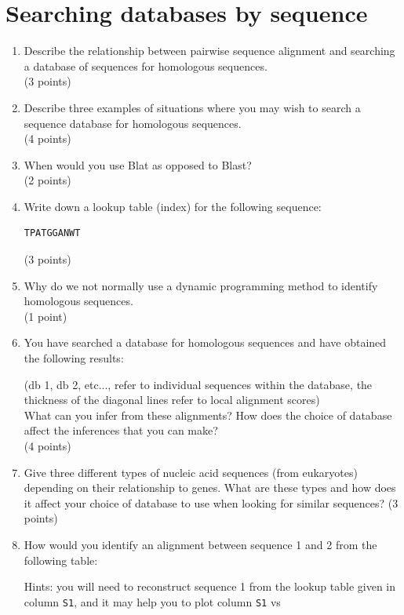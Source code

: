 \documentclass[11pt]{article}
\begin{document}
\section{Searching databases by sequence}
\begin{enumerate}
\item Describe the relationship between pairwise sequence alignment and
  searching a database of sequences for homologous sequences.\\
  (3 points)
\item Describe three examples of situations where you may wish to search a
  sequence database for homologous sequences.\\
  (4 points)
\item When would you use Blat as opposed to Blast?\\
  (2 points)
\item Write down a lookup table (index) for the following sequence:
\begin{verbatim}
TPATGGANWT
\end{verbatim}
 (3 points)
\item Why do we not normally use a dynamic programming method to identify
  homologous sequences.\\
  (1 point)
\item You have searched a database for homologous sequences and have obtained
  the following results:
\begin{figure}[H]
  
\end{figure}
{\small(db 1, db 2, etc..., refer to individual sequences within the database, the
thickness of the diagonal lines refer to local alignment scores)}\\
What can you infer from these alignments? How does the choice of database
affect the inferences that you can make?\\
(4 points)
\item Give three different types of nucleic acid sequences (from eukaryotes)
  depending on their relationship to genes. What are these types and how does
  it affect your choice of database to use when looking for similar sequences?
(3 points)
\item How would you identify an alignment between sequence 1 and 2 from the following table:
\begin{figure}[H]
  
\end{figure}
{\small Hints: you will need to reconstruct sequence 1 from the lookup table
  given in column \texttt{S1}, and it may help you to plot column \texttt{S1} vs
}
\end{enumerate}
\end{document}
